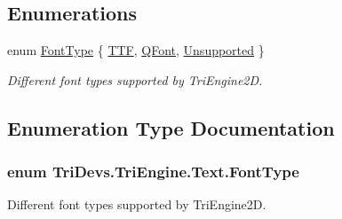 \subsection*{Enumerations}
\begin{DoxyCompactItemize}
\item 
enum \hyperlink{namespace_tri_devs_1_1_tri_engine_1_1_text_a823573b800952d8909dc50e1efa3358b}{Font\-Type} \{ \hyperlink{namespace_tri_devs_1_1_tri_engine_1_1_text_a823573b800952d8909dc50e1efa3358ba89efbd41f5cc30a3b8a1d8465072df0e}{T\-T\-F}, 
\hyperlink{namespace_tri_devs_1_1_tri_engine_1_1_text_a823573b800952d8909dc50e1efa3358bad9365391881185588cc0b276759c9ec5}{Q\-Font}, 
\hyperlink{namespace_tri_devs_1_1_tri_engine_1_1_text_a823573b800952d8909dc50e1efa3358bab4080bdf74febf04d578ff105cce9d3f}{Unsupported}
 \}
\begin{DoxyCompactList}\small\item\em Different font types supported by Tri\-Engine2\-D. \end{DoxyCompactList}\end{DoxyCompactItemize}


\subsection{Enumeration Type Documentation}
\hypertarget{namespace_tri_devs_1_1_tri_engine_1_1_text_a823573b800952d8909dc50e1efa3358b}{
\subsubsection[{Font\-Type}]{\setlength{\rightskip}{0pt plus 5cm}enum {\bf Tri\-Devs.\-Tri\-Engine.\-Text.\-Font\-Type}}}\label{namespace_tri_devs_1_1_tri_engine_1_1_text_a823573b800952d8909dc50e1efa3358b}


Different font types supported by Tri\-Engine2\-D. 


